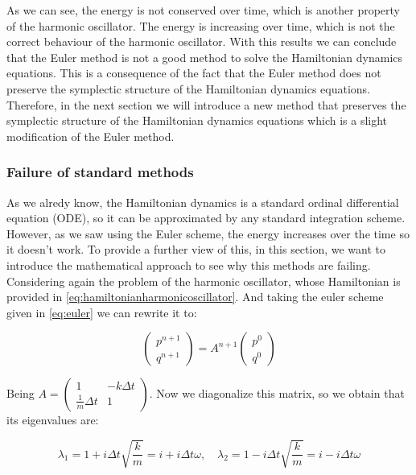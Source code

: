 \documentclass{article}
\begin{document}
As we can see, the energy is not conserved over time, which is another property of the harmonic oscillator. The energy is increasing over time, which is not the correct behaviour of the harmonic oscillator. With this results we can conclude that the Euler method is not a good method to solve the Hamiltonian dynamics equations. This is a consequence of the fact that the Euler method does not preserve the symplectic structure of the Hamiltonian dynamics equations. Therefore, in the next section we will introduce a new method that preserves the symplectic structure of the Hamiltonian dynamics equations which is a slight modification of the Euler method.

\subsubsection{Failure of standard methods}
\label{sec:failure_standard_methods}

As we alredy know, the Hamiltonian dynamics is a standard ordinal differential equation (ODE), so it can be approximated by any standard integration scheme. However, as we saw using the Euler scheme, the energy increases over the time so it doesn't work. To provide a further view of this, in this section, we want to introduce the mathematical approach to see why this methods are failing. Considering again the problem of the harmonic oscillator, whose Hamiltonian is provided in \ref{eq:hamiltonianharmonicoscillator}. And taking the euler scheme given in \ref{eq:euler} we can rewrite it to:

\[
	\begin{pmatrix} p^{n+1} \\ q^{n+1} \end{pmatrix} = A^{n+1} \begin{pmatrix} p^{0} \\ q^{0} \end{pmatrix}
\]

Being \(A = \begin{pmatrix} 1 & -k\Delta t \\ \frac{1}{m} \Delta t & 1  \end{pmatrix}\). Now we diagonalize this matrix, so we obtain that its eigenvalues are:

\[
	\lambda_1 = 1 + i\Delta t\sqrt{\frac{k}{m}} = i + i \Delta t \omega, \quad
	\lambda_2 = 1 - i\Delta t\sqrt{\frac{k}{m}} = i - i \Delta t \omega
\]
\end{document}
